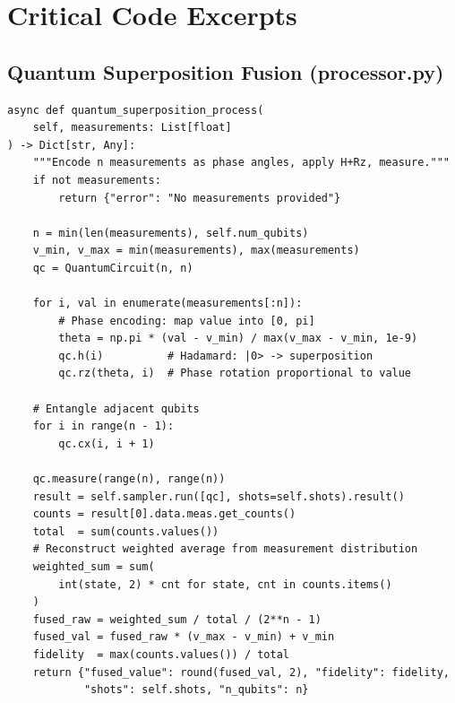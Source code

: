 \documentclass[12pt,a4paper]{article}
\begin{document}
\clearpage

\section{Critical Code Excerpts}
\label{app:code}

\subsection{Quantum Superposition Fusion (processor.py)}
\label{app:code:quantum}

\begin{lstlisting}[caption={Quantum superposition-based multi-source fusion
                            (backend/quantum/processor.py, lines 89--128)},
                   label=lst:qfusion]
async def quantum_superposition_process(
    self, measurements: List[float]
) -> Dict[str, Any]:
    """Encode n measurements as phase angles, apply H+Rz, measure."""
    if not measurements:
        return {"error": "No measurements provided"}

    n = min(len(measurements), self.num_qubits)
    v_min, v_max = min(measurements), max(measurements)
    qc = QuantumCircuit(n, n)

    for i, val in enumerate(measurements[:n]):
        # Phase encoding: map value into [0, pi]
        theta = np.pi * (val - v_min) / max(v_max - v_min, 1e-9)
        qc.h(i)          # Hadamard: |0> -> superposition
        qc.rz(theta, i)  # Phase rotation proportional to value

    # Entangle adjacent qubits
    for i in range(n - 1):
        qc.cx(i, i + 1)

    qc.measure(range(n), range(n))
    result = self.sampler.run([qc], shots=self.shots).result()
    counts = result[0].data.meas.get_counts()
    total  = sum(counts.values())
    # Reconstruct weighted average from measurement distribution
    weighted_sum = sum(
        int(state, 2) * cnt for state, cnt in counts.items()
    )
    fused_raw = weighted_sum / total / (2**n - 1)
    fused_val = fused_raw * (v_max - v_min) + v_min
    fidelity  = max(counts.values()) / total
    return {"fused_value": round(fused_val, 2), "fidelity": fidelity,
            "shots": self.shots, "n_qubits": n}
\end{lstlisting}
\end{document}
